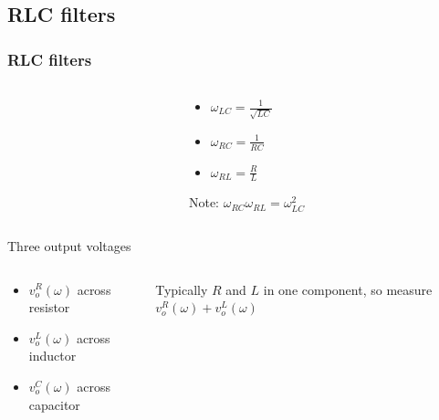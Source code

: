 \documentclass[beamer]{standalone}
\begin{document}
\subsection{RLC filters}
\begin{frame}
 \frametitle{RLC filters}
 \begin{columns}
  \begin{column}{0.4\textwidth}
  \end{column}
  \begin{column}{0.6\textwidth}
   \begin{itemize}
    \item $\omega_{LC} = \frac{1}{\sqrt{LC}}$
    \item $\omega_{RC} = \frac{1}{RC}$
    \item $\omega_{RL} = \frac{R}{L}$
   \end{itemize}
   Note: $\omega_{RC} \omega_{RL} = \omega^2_{LC}$
  \end{column}
 \end{columns}
 \begin{block}{Three output voltages}
  \begin{columns}
   \begin{column}{0.5\textwidth}
    \begin{itemize}
     \item $v_o^R(\omega)$ across resistor
     \item $v_o^L(\omega)$ across inductor
     \item $v_o^C(\omega)$ across capacitor
    \end{itemize}
   \end{column}
   \begin{column}{0.5\textwidth}
    Typically $R$ and $L$ in one component, so measure $v_o^R(\omega) + v_o^L(\omega)$
   \end{column}
  \end{columns}
 \end{block}
\end{frame}
\end{document}
